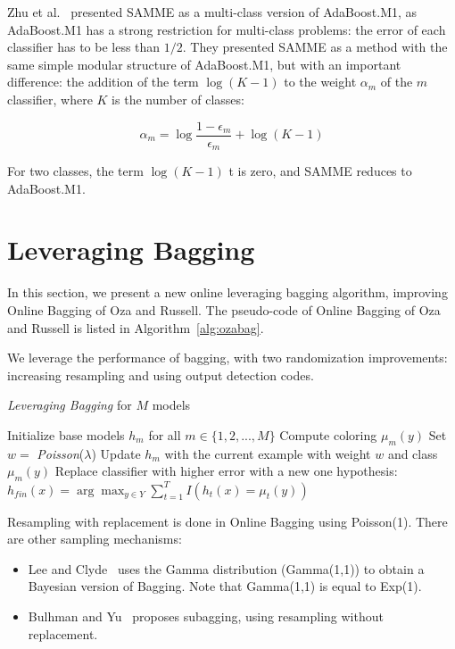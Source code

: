 Zhu et al.~\cite{multiclassadaboost} presented SAMME as a multi-class version of AdaBoost.M1, as AdaBoost.M1 has a strong restriction for multi-class problems: the error of each classifier has to be less than $1/2$. They presented SAMME as a method with the same simple modular structure of AdaBoost.M1, but with an important difference: the addition of the term $\log (K-1)$ to the weight $\alpha_m$ of the $m$ classifier, where $K$ is the number of classes:

$$\alpha_{m} = \log \frac{1 - \epsilon_{m}}{\epsilon_{m} } + \log (K-1)$$
 
 For two classes, the term  $\log (K-1)$ t is zero, and SAMME reduces to AdaBoost.M1. 

\ENDOMIT
\section{Leveraging Bagging}
\label{Per}

In this section, we present a new online leveraging bagging algorithm, improving Online Bagging of  Oza and Russell.
The pseudo-code of Online Bagging of Oza and Russell 
is listed in Algorithm~\ref{alg:ozabag}.

We leverage the performance of bagging, with two randomization improvements: increasing resampling and using output detection codes.


\begin{algorithm}
\caption{{\em Leveraging  Bagging} for $M$ models} %
\begin{algorithmic}[1]
\STATE Initialize base models $h_{m}$ for all $m \in \{1,2,...,M\}$
\STATE Compute coloring $\mu_m(y)$
{}
\STATE Set $w = $ {\em Poisson}($\lambda$)
\STATE Update $h_{m}$ with the current example with weight $w$ and class $\mu_m(y)$
\ENDFOR
\ENDFOR
{}
\STATE Replace classifier with higher error with a new one 
\ENDIF
{}
\RETURN hypothesis: $h_{fin}(x) = \arg \max_{y \in Y} \sum_{t=1}^{T} I(h_{t}(x) =\mu_t( y))$
\end{algorithmic}
\label{alg:levbag}
\end{algorithm}
 

 Resampling with replacement is done in Online Bagging using Poisson(1). 
 There are other sampling mechanisms:
 \begin{itemize}
\item    Lee and Clyde~\cite{bayesian} uses the Gamma distribution (Gamma(1,1)) to obtain a Bayesian version of Bagging. Note that Gamma(1,1) is equal to Exp(1). 
\item Bulhman and Yu~\cite{yu-bag} proposes subagging, using resampling without replacement. 
\end{itemize}

